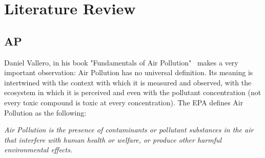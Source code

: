 
\chapter{Literature Review}%
\label{cha:literature_review}

\section{\acrlong{AP}}%
\label{sec:ap}

Daniel Vallero, in his book "Fundamentals of Air
Pollution"~\cite{Vallero2014} makes a very important observation: Air
Pollution has no universal definition. Its meaning is intertwined with
the context with which it is measured and observed, with the ecosystem
in which it is perceived and even with the pollutant concentration (not
every toxic compound is toxic at every concentration). The \gls{EPA}
defines Air Pollution as the following:

\begin{center}
    \begin{minipage}{0.8\textwidth}

        \noindent \textit{Air Pollution is the presence of contaminants
        or pollutant substances in the air that interfere with human
        health or welfare, or produce other harmful environmental effects.}

    \end{minipage}
\end{center}

